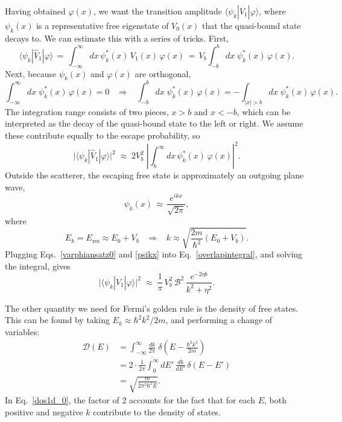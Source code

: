 \documentclass[pra,12pt]{revtex4-2}
\begin{document}
Having obtained $\varphi(x)$, we want the transition amplitude
$\langle\psi_k|\hat{V}_1|\varphi\rangle$, where $\psi_k(x)$ is a
representative free eigenstate of $V_0(x)$ that the quasi-bound state
decays to.  We can estimate this with a series of tricks.  First,
\begin{equation}
  \langle\psi_k|\hat{V}_1|\varphi\rangle \,=\, \int_{-\infty}^\infty dx \, \psi_k^*(x)\, V_1(x)\, \varphi(x) \,=\, V_b \int_{-b}^b dx \; \psi_k^*(x) \,\varphi(x).
\end{equation}
Next, because $\psi_k(x)$ and $\varphi(x)$ are orthogonal,
\begin{equation}
  \int_{-\infty}^\infty dx \; \psi_k^*(x) \,\varphi(x) = 0
  \;\;\;\Rightarrow \;\;\;  
  \int_{-b}^b dx \; \psi_k^*(x) \,\varphi(x) = - \int_{|x| > b} dx \; \psi_k^*(x) \,\varphi(x).
\end{equation}
The integration range consists of two pieces, $x > b$ and $x < -b$,
which can be interpreted as the decay of the quasi-bound state to the
left or right.  We assume these contribute equally to the escape
probability, so
\begin{equation}
  \big| \langle\psi_k|\hat{V}_1|\varphi\rangle \big|^2
  \;\approx\; 2 V_b^2 \;
  \left| \int_{b}^\infty dx \, \psi_k^*(x)\, \varphi(x)\right|^2.
  \label{overlapintegral}
\end{equation}
Outside the scatterer, the escaping free state is approximately an
outgoing plane wave,
\begin{equation}
  \psi_k(x) \,\approx\, \frac{e^{ikx}}{\sqrt{2\pi}},
  \label{psikx}
\end{equation}
where
\begin{equation}
  E_k = E_{\mathrm{res}} \approx E_0 + V_b \;\;\;\Rightarrow \;\;\; k \approx \sqrt{\frac{2m}{\hbar^2}(E_0+V_b)}.
\end{equation}
Plugging Eqs.~\eqref{varphiansatz0} and \eqref{psikx} into
Eq.~\eqref{overlapintegral}, and solving the integral, gives
\begin{equation}
  \big| \langle\psi_k|\hat{V}_1|\varphi\rangle \big|^2
  \;\approx \; \frac{1}{\pi}\, V_b^2 \, \mathcal{B}^2\,
  \frac{e^{-2\eta b}}{k^2 + \eta^2}.
  \label{overlap1d}
\end{equation}

The other quantity we need for Fermi's golden rule is the density of
free states.  This can be found by taking $E_k \approx \hbar^2k^2/2m$,
and performing a change of variables:
\begin{align}
  \mathcal{D}(E)
  &= \int_{-\infty}^\infty \frac{dk}{2\pi} \; \delta\left(E-\frac{\hbar^2k^2}{2m}\right) \\
  &= 2 \cdot \frac{1}{2\pi} \int_0^\infty dE' \, \frac{dk}{dE'} \, \delta(E-E') \label{dos1d_0} \\
  &= \sqrt{\frac{m}{2\pi^2\hbar^2 E}}.
  \label{dos1d}
\end{align}
In Eq.~\eqref{dos1d_0}, the factor of 2 accounts for the fact that for
each $E$, both positive and negative $k$ contribute to the density of
states.
\end{document}
